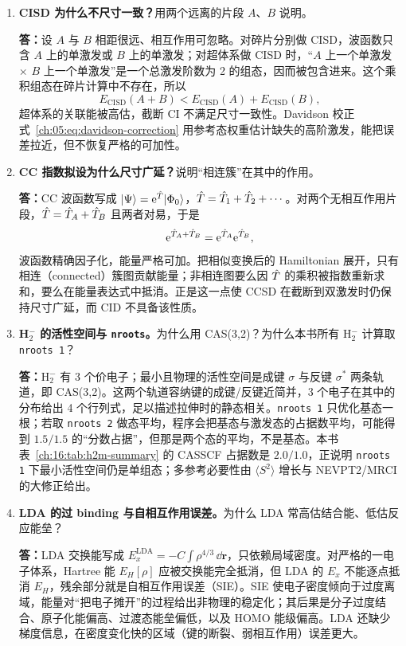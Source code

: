 \begin{enumerate}[label=\textbf{\arabic*.}, leftmargin=2.2em, itemsep=6pt]
\item \textbf{CISD 为什么不尺寸一致？}用两个远离的片段 $A$、$B$ 说明。

\textbf{答：}设 $A$ 与 $B$ 相距很远、相互作用可忽略。对碎片分别做 CISD，波函数只含 $A$ 上的单激发或 $B$ 上的单激发；对超体系做 CISD 时，“$A$ 上一个单激发 $\times$ $B$ 上一个单激发”是一个总激发阶数为 2 的组态，因而被包含进来。这个乘积组态在碎片计算中不存在，所以
\[
E_{\mathrm{CISD}}(A+B)<E_{\mathrm{CISD}}(A)+E_{\mathrm{CISD}}(B),
\]
超体系的关联能被高估，截断 CI 不满足尺寸一致性。Davidson 校正式~\eqref{ch:05:eq:davidson-correction} 用参考态权重估计缺失的高阶激发，能把误差拉近，但不恢复严格的可加性。

\item \textbf{CC 指数拟设为什么尺寸广延？}说明“相连簇”在其中的作用。

\textbf{答：}CC 波函数写成 $\lvert \Psi\rangle=\mathrm{e}^{\hat{T}}\lvert \Phi_0\rangle$，$\hat{T}=\hat{T}_1+\hat{T}_2+\cdots$。对两个无相互作用片段，$\hat{T}=\hat{T}_A+\hat{T}_B$ 且两者对易，于是
\[
\mathrm{e}^{\hat{T}_A+\hat{T}_B}=\mathrm{e}^{\hat{T}_A}\mathrm{e}^{\hat{T}_B},
\]
波函数精确因子化，能量严格可加。把相似变换后的 Hamiltonian 展开，只有相连（connected）簇图贡献能量；非相连图要么因 $\hat{T}$ 的乘积被指数重新求和，要么在能量表达式中抵消。正是这一点使 CCSD 在截断到双激发时仍保持尺寸广延，而 CID 不具备该性质\citep{cizek1966,purvis1982}。

\item \textbf{H$_2^-$ 的活性空间与 \texttt{nroots}。}为什么用 CAS(3,2)？为什么本书所有 H$_2^-$ 计算取 \texttt{nroots 1}？

\textbf{答：}H$_2^-$ 有 3 个价电子；最小且物理的活性空间是成键 $\sigma$ 与反键 $\sigma^*$ 两条轨道，即 CAS(3,2)。这两个轨道容纳键的成键/反键近简并，3 个电子在其中的分布给出 4 个行列式，足以描述拉伸时的静态相关。\texttt{nroots 1} 只优化基态一根；若取 \texttt{nroots 2} 做态平均，程序会把基态与激发态的占据数平均，可能得到 $1.5/1.5$ 的“分数占据”，但那是两个态的平均，不是基态。本书表~\ref{ch:16:tab:h2m-summary} 的 CASSCF 占据数是 $2.0/1.0$，正说明 \texttt{nroots 1} 下最小活性空间仍是单组态；多参考必要性由 $\langle S^2\rangle$ 增长与 NEVPT2/MRCI 的大修正给出。

\item \textbf{LDA 的过 binding 与自相互作用误差。}为什么 LDA 常高估结合能、低估反应能垒？

\textbf{答：}LDA 交换能写成 $E_x^{\mathrm{LDA}}=-C\int\rho^{4/3}\,\dd\mathbf{r}$，只依赖局域密度。对严格的一电子体系，Hartree 能 $E_H[\rho]$ 应被交换能完全抵消，但 LDA 的 $E_x$ 不能逐点抵消 $E_H$，残余部分就是自相互作用误差（SIE）。SIE 使电子密度倾向于过度离域，能量对“把电子摊开”的过程给出非物理的稳定化；其后果是分子过度结合、原子化能偏高、过渡态能垒偏低，以及 HOMO 能级偏高。LDA 还缺少梯度信息，在密度变化快的区域（键的断裂、弱相互作用）误差更大\citep{perdew1981sie}。


\end{enumerate}
